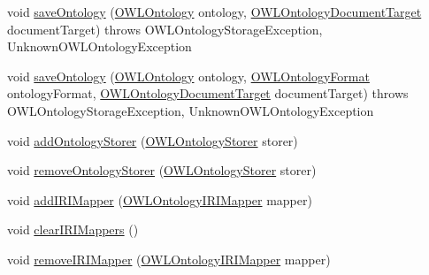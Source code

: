 \begin{DoxyCompactItemize}
\item 
void \hyperlink{classuk_1_1ac_1_1manchester_1_1cs_1_1owl_1_1owlapi_1_1_o_w_l_ontology_manager_impl_a5c3afb9b5acc3218e0960f24503a818e}{save\-Ontology} (\hyperlink{interfaceorg_1_1semanticweb_1_1owlapi_1_1model_1_1_o_w_l_ontology}{O\-W\-L\-Ontology} ontology, \hyperlink{interfaceorg_1_1semanticweb_1_1owlapi_1_1io_1_1_o_w_l_ontology_document_target}{O\-W\-L\-Ontology\-Document\-Target} document\-Target)  throws O\-W\-L\-Ontology\-Storage\-Exception,             Unknown\-O\-W\-L\-Ontology\-Exception 
\item 
void \hyperlink{classuk_1_1ac_1_1manchester_1_1cs_1_1owl_1_1owlapi_1_1_o_w_l_ontology_manager_impl_a9083ee7390709b5c4ad57591cdee3824}{save\-Ontology} (\hyperlink{interfaceorg_1_1semanticweb_1_1owlapi_1_1model_1_1_o_w_l_ontology}{O\-W\-L\-Ontology} ontology, \hyperlink{classorg_1_1semanticweb_1_1owlapi_1_1model_1_1_o_w_l_ontology_format}{O\-W\-L\-Ontology\-Format} ontology\-Format, \hyperlink{interfaceorg_1_1semanticweb_1_1owlapi_1_1io_1_1_o_w_l_ontology_document_target}{O\-W\-L\-Ontology\-Document\-Target} document\-Target)  throws O\-W\-L\-Ontology\-Storage\-Exception,             Unknown\-O\-W\-L\-Ontology\-Exception 
\item 
void \hyperlink{classuk_1_1ac_1_1manchester_1_1cs_1_1owl_1_1owlapi_1_1_o_w_l_ontology_manager_impl_ae0c7b0bb1a2b6f4ff8c967a0c81131da}{add\-Ontology\-Storer} (\hyperlink{interfaceorg_1_1semanticweb_1_1owlapi_1_1model_1_1_o_w_l_ontology_storer}{O\-W\-L\-Ontology\-Storer} storer)
\item 
void \hyperlink{classuk_1_1ac_1_1manchester_1_1cs_1_1owl_1_1owlapi_1_1_o_w_l_ontology_manager_impl_ac1afa865faa04655746b1aa4263bd537}{remove\-Ontology\-Storer} (\hyperlink{interfaceorg_1_1semanticweb_1_1owlapi_1_1model_1_1_o_w_l_ontology_storer}{O\-W\-L\-Ontology\-Storer} storer)
\item 
void \hyperlink{classuk_1_1ac_1_1manchester_1_1cs_1_1owl_1_1owlapi_1_1_o_w_l_ontology_manager_impl_adbd4885354966e0581b32cc6986495f9}{add\-I\-R\-I\-Mapper} (\hyperlink{interfaceorg_1_1semanticweb_1_1owlapi_1_1model_1_1_o_w_l_ontology_i_r_i_mapper}{O\-W\-L\-Ontology\-I\-R\-I\-Mapper} mapper)
\item 
void \hyperlink{classuk_1_1ac_1_1manchester_1_1cs_1_1owl_1_1owlapi_1_1_o_w_l_ontology_manager_impl_a6e74115148505aacf876244c2ad8584b}{clear\-I\-R\-I\-Mappers} ()
\item 
void \hyperlink{classuk_1_1ac_1_1manchester_1_1cs_1_1owl_1_1owlapi_1_1_o_w_l_ontology_manager_impl_acbfb1f1be97a33e7ce68abddffb31b3c}{remove\-I\-R\-I\-Mapper} (\hyperlink{interfaceorg_1_1semanticweb_1_1owlapi_1_1model_1_1_o_w_l_ontology_i_r_i_mapper}{O\-W\-L\-Ontology\-I\-R\-I\-Mapper} mapper)

\end{DoxyCompactItemize}
